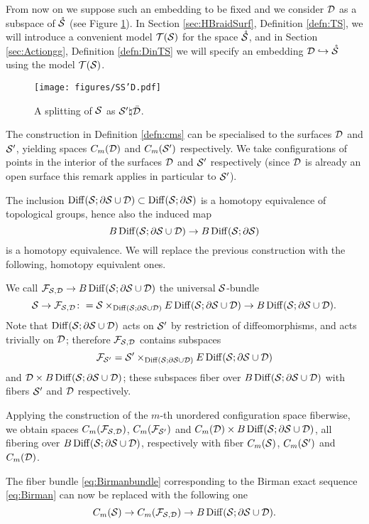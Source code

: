 From now on we suppose such an embedding to be fixed and we consider $\D$ as a subspace
of $\mrS$ (see Figure \ref{fig:SS'D}). In Section \ref{sec:HBraidSurf}, Definition \ref{defn:TS},
we will introduce a convenient model $\T(\S)$ for the space $\mrS$, and in Section \ref{sec:Actiongg},
Definition \ref{defn:DinTS}
we will specify an embedding $\D\hookrightarrow\mrS$ using the model $\T(\S)$.

\begin{figure}\centering
 \texttt{[image: figures/SS'D.pdf]}
 \caption{A splitting of $\S$ as $\S'\natural\bar\D$.}
\label{fig:SS'D}
\end{figure}

The construction in Definition \ref{defn:cms} can be specialised to the
surfaces $\D$ and $\S'$, yielding spaces $C_m(\D)$ and $C_m(\S')$ respectively.
We take configurations of points in the interior of the surfaces $\D$ and $\S'$ respectively
(since $\D$ is already an open surface this remark applies in particular to $\S'$).

The inclusion $\Diff(\S;\partial\S\cup\D)\subset\Diff(\S;\partial\S)$ is a homotopy
equivalence of topological groups, hence also the induced map
\[
B\Diff(\S;\partial\S\cup\D)\to B\Diff(\S;\partial\S)
\]
is a homotopy equivalence. We will replace the previous construction with the following,
homotopy equivalent ones.
\begin{defn}
\label{defn:universalSbundle}
We call $\cF_{\S,\D}\to B\Diff(\S;\partial\S\cup\D)$
the universal $\S$-bundle
 \[
  \S\to\cF_{\S,\D}\colon=\S\times_{\Diff(\S;\partial\S\cup\D)}E\Diff(\S;\partial\S\cup\D)\to B\Diff(\S;\partial\S\cup\D).
 \]
Note that $\Diff(\S;\partial\S\cup\D)$ acts on $\S'$ by restriction of diffeomorphisms, and acts trivially
on $\D$; therefore $\cF_{\S,\D}$ contains subspaces
\[
 \cF_{\S'}= \S'\times_{\Diff(\S;\partial\S\cup\D)}E\Diff(\S;\partial\S\cup\D)
\]
and $\D\times B\Diff(\S;\partial\S\cup\D)$; these subspaces fiber over $B\Diff(\S;\partial\S\cup\D)$
with fibers $\S'$ and $\D$ respectively.

Applying the construction of the $m$-th unordered configuration space fiberwise, we obtain spaces
$C_m(\cF_{\S,\D})$, $C_m(\cF_{\S'})$ and $C_m(\D)\times B\Diff(\S;\partial\S\cup\D)$,
all fibering over $B\Diff(\S;\partial\S\cup\D)$, respectively with fiber $\cms$,
$C_m(\S')$ and $C_m(\D)$.
\end{defn}
The fiber bundle \eqref{eq:Birmanbundle} corresponding to the Birman exact sequence \eqref{eq:Birman}
can now be replaced with the following one
\begin{equation}\label{eq:BirmanbundleD}
\cms\to C_m(\cF_{\S,\D})\to B\Diff(\S;\partial\S\cup\D).
\end{equation}

